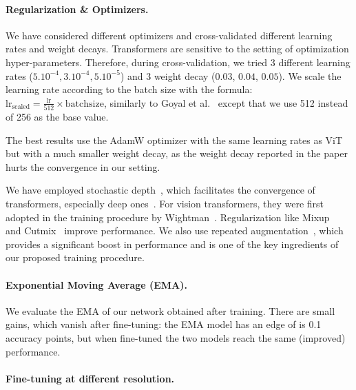 \paragraph{Regularization \& Optimizers.}


We have considered different optimizers and cross-validated different learning rates and weight decays. 
Transformers are sensitive to the setting of optimization hyper-parameters. %
Therefore, during cross-validation, we tried 3 different learning rates ($5.10^{-4}, 3.10^{-4}, 5.10^{-5}$) and 3 weight decay ($0.03$, $0.04$, $0.05$).
We scale the learning rate according to the batch size with the formula:
$\mathrm{lr}_{\mathrm{scaled}}=\frac{\mathrm{lr}}{512} \times \mathrm{batch size}$, similarly to Goyal et al.~\cite{Goyal2017AccurateLM} except that we use 512 instead of 256 as the base value.

The best results use the AdamW optimizer with the same learning rates as ViT~\cite{dosovitskiy2020image} but with a much smaller weight decay, as the weight decay reported in the paper hurts the convergence in our setting.

We have employed stochastic depth~\cite{Huang2016DeepNW}, which facilitates the convergence of transformers, especially deep ones~\cite{fan2019reducing,fan2020training}. For vision transformers, they were first adopted in the training procedure by Wightman~\cite{pytorchmodels}. 
Regularization like Mixup~\cite{Zhang2017Mixup} and Cutmix~\cite{Yun2019CutMix} improve performance. We also use repeated augmentation~\cite{berman2019multigrain,hoffer2020augment}, which provides a significant boost in performance and is one of the key ingredients of our proposed training procedure. 

\paragraph{Exponential Moving Average (EMA).} 
We evaluate the EMA of our network obtained after training. 
There are small gains, which vanish after fine-tuning: the EMA model has an edge of is 0.1 accuracy points, but when fine-tuned the two models reach the same (improved) performance.

\paragraph{Fine-tuning at different resolution.}  


